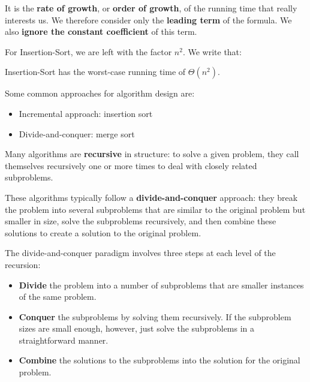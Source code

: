    \par It is the \textbf{rate of growth}, or \textbf{order of growth}, of the running time
    that really interests us. We therefore consider only the \textbf{leading term} of the
    formula.
    We also \textbf{ignore the constant coefficient} of this term.
    \par For Insertion-Sort, we are left with the factor $n^{2}$. We write that:
    \begin{center}
      Insertion-Sort has the worst-case running time of $\Theta(n^{2})$.
    \end{center}

    \par Some common approaches for algorithm design are:
    \begin{itemize}
      \item Incremental approach: insertion sort
      \item Divide-and-conquer: merge sort
    \end{itemize}
      \par Many algorithms are \textbf{recursive} in structure: to solve a given problem,
      they call themselves recursively one or more times to deal with closely related
      subproblems.
      \par These algorithms typically follow a \textbf{divide-and-conquer} approach:
      they break the problem into several subproblems that are similar to the original
      problem but smaller in size, solve the subproblems recursively, and then combine
      these solutions to create a solution to the original problem.
      \par The divide-and-conquer paradigm involves three steps at each level of the
      recursion:
      \begin{itemize}
        \item \textbf{Divide} the problem into a number of subproblems that are smaller
          instances of the same problem.
        \item \textbf{Conquer} the subproblems by solving them recursively. If the
          subproblem sizes are small enough, however, just solve the subproblems in a
          straightforward manner.
        \item \textbf{Combine} the solutions to the subproblems into the solution for the
          original problem.
      \end{itemize}

